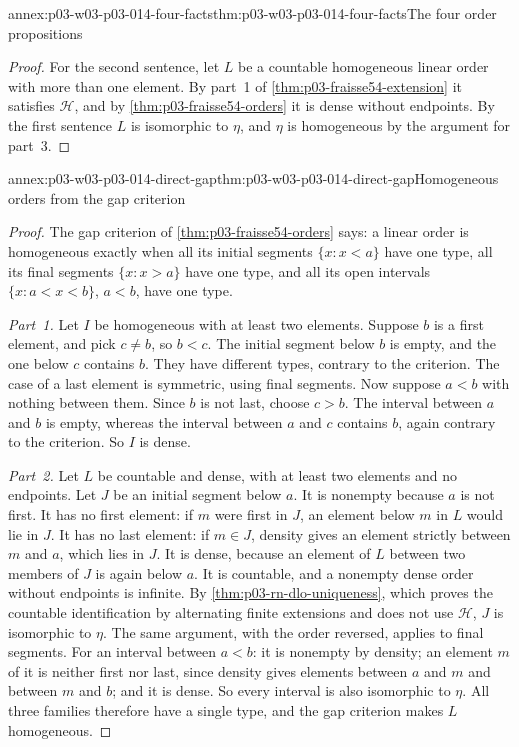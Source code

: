 \begin{annexitem}{annex:p03-w03-p03-014-four-facts}{thm:p03-w03-p03-014-four-facts}{The four order propositions}
\begin{proof}
For the second sentence, let \(L\) be a countable homogeneous linear
order with more than one element. By part~1 of
\cref{thm:p03-fraisse54-extension} it satisfies \(\mathcal H\), and by
\cref{thm:p03-fraisse54-orders} it is dense without endpoints. By the
first sentence \(L\) is isomorphic to \(\eta\), and \(\eta\) is
homogeneous by the argument for part~3.
\end{proof}
\end{annexitem}

\begin{annexitem}{annex:p03-w03-p03-014-direct-gap}{thm:p03-w03-p03-014-direct-gap}{Homogeneous orders from the gap criterion}
\begin{proof}
The gap criterion of \cref{thm:p03-fraisse54-orders} says: a linear
order is homogeneous exactly when all its initial segments
\(\{x:x<a\}\) have one type, all its final segments \(\{x:x>a\}\) have
one type, and all its open intervals \(\{x:a<x<b\}\), \(a<b\), have
one type.

\emph{Part~1.} Let \(I\) be homogeneous with at least two elements.
Suppose \(b\) is a first element, and pick \(c\neq b\), so \(b<c\).
The initial segment below \(b\) is empty, and the one below \(c\)
contains \(b\). They have different types, contrary to the criterion.
The case of a last element is symmetric, using final segments. Now
suppose \(a<b\) with nothing between them. Since \(b\) is not last,
choose \(c>b\). The interval between \(a\) and \(b\) is empty, whereas
the interval between \(a\) and \(c\) contains \(b\), again contrary to
the criterion. So \(I\) is dense.

\emph{Part~2.} Let \(L\) be countable and dense, with at least two
elements and no endpoints. Let \(J\) be an initial segment below \(a\).
It is nonempty because \(a\) is not first. It has no first element: if
\(m\) were first in \(J\), an element below \(m\) in \(L\) would lie in
\(J\). It has no last element: if \(m\in J\), density gives an element
strictly between \(m\) and \(a\), which lies in \(J\). It is dense,
because an element of \(L\) between two members of \(J\) is again below
\(a\). It is countable, and a nonempty dense order without endpoints is
infinite. By \cref{thm:p03-rn-dlo-uniqueness}, which proves the countable
identification by alternating finite extensions and does not use
\(\mathcal H\), \(J\) is isomorphic to \(\eta\). The same argument, with
the order reversed, applies to final segments. For an interval between
\(a<b\): it is nonempty by density; an element \(m\) of it is neither
first nor last, since density gives elements between \(a\) and \(m\) and
between \(m\) and \(b\); and it is dense. So every interval is also
isomorphic to \(\eta\). All three families therefore have a single
type, and the gap criterion makes \(L\) homogeneous.
\end{proof}
\end{annexitem}

